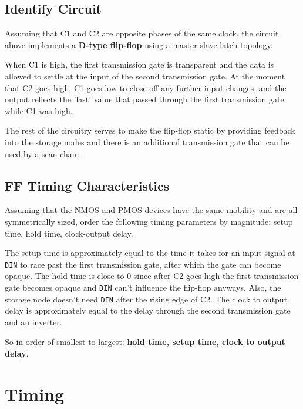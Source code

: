 \documentclass[11pt]{article}
\begin{document}
\subsection{Identify Circuit}

Assuming that C1 and C2 are opposite phases of the same clock, the circuit above implements a \textbf{D-type flip-flop} using a master-slave latch topology.

When C1 is high, the first transmission gate is transparent and the data is allowed to settle at the input of the second transmission gate. At the moment that C2 goes high, C1 goes low to close off any further input changes, and the output reflects the 'last' value that passed through the first transmission gate while C1 was high.

The rest of the circuitry serves to make the flip-flop static by providing feedback into the storage nodes and there is an additional transmission gate that can be used by a scan chain.

\subsection{FF Timing Characteristics}
Assuming that the NMOS and PMOS devices have the same mobility and are all symmetrically sized, order the following timing parameters by magnitude: setup time, hold time, clock-output delay.

The setup time is approximately equal to the time it takes for an input signal at \verb|DIN| to race past the first transmission gate, after which the gate can become opaque. The hold time is close to 0 since after C2 goes high the first transmission gate becomes opaque and \verb|DIN| can't influence the flip-flop anyways. Also, the storage node doesn't need \verb|DIN| after the rising edge of C2. The clock to output delay is approximately equal to the delay through the second transmission gate and an inverter.

So in order of smallest to largest: \textbf{hold time, setup time, clock to output delay}.

\section{Timing}


\newpage
\appendix
\end{document}
